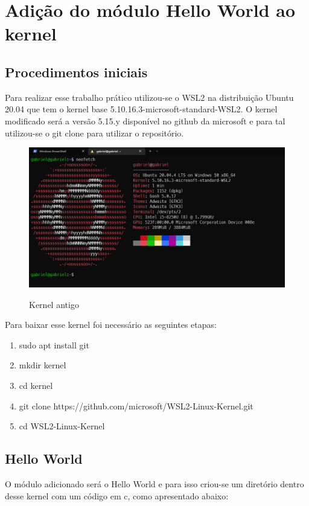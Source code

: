 \documentclass[a4paper, 12pt]{article}
\begin{document}
\newpage
{}
\section{Adição do módulo Hello World ao kernel}

\subsection{Procedimentos iniciais}
Para realizar esse trabalho prático utilizou-se o WSL2 na distribuição Ubuntu 20.04 que tem o kernel base 5.10.16.3-microsoft-standard-WSL2. O kernel modificado será a versão 5.15.y disponível no github da microsoft e para tal utilizou-se o git clone para utilizar o repositório. 

\begin{figure}[h]
\centering 
\includegraphics[width=13.5cm]{old_kernel.png}
\label{figura:oldkernel}
\caption{Kernel antigo}
\end{figure}

Para baixar esse kernel foi necessário as seguintes etapas:

\begin{enumerate}
    \item sudo apt install git
    \item mkdir kernel
    \item cd kernel
    \item git clone https://github.com/microsoft/WSL2-Linux-Kernel.git
    \item cd WSL2-Linux-Kernel
\end{enumerate}

\subsection{Hello World}
O módulo adicionado será o Hello World e para isso criou-se um diretório dentro desse kernel com um código em c, como apresentado abaixo:
\end{document}
